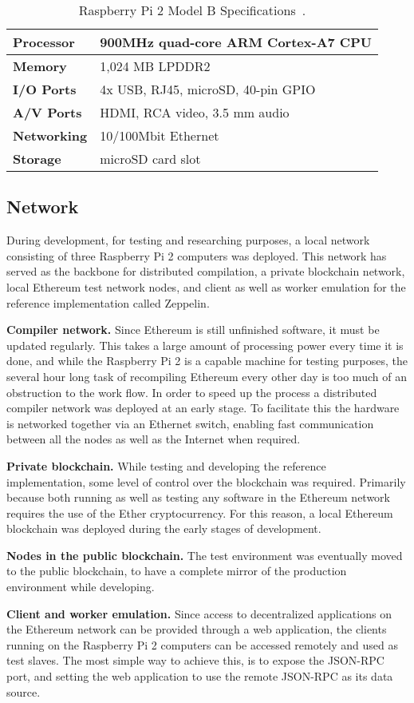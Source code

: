 \begin{table}[h]
\centering
\caption{Raspberry Pi 2 Model B Specifications~\cite{rpi}.}
\label{rpi}
\begin{tabular}{|l|l|}
\hline \textbf{Processor} & 900MHz quad-core ARM Cortex-A7 CPU \\ \hline
\textbf{Memory} & 1,024 MB LPDDR2 \\ \hline 
\textbf{I/O Ports} & 4x USB, RJ45, microSD, 40-pin GPIO \\ \hline
\textbf{A/V Ports} & HDMI, RCA video, 3.5 mm audio \\ \hline
\textbf{Networking} & 10/100Mbit Ethernet \\ \hline
\textbf{Storage} & microSD card slot \\ \hline
\end{tabular}
\end{table}

\subsection{Network}
During development, for testing and researching purposes, a local network consisting of three Raspberry Pi 2 computers was deployed. This network has served as the backbone for distributed compilation, a private blockchain network, local Ethereum test network nodes, and client as well as worker emulation for the reference implementation called Zeppelin.

\textbf{Compiler network.} Since Ethereum is still unfinished software, it must be updated regularly. This takes a large amount of processing power every time it is done, and while the Raspberry Pi 2 is a capable machine for testing purposes, the several hour long task of recompiling Ethereum every other day is too much of an obstruction to the work flow. In order to speed up the process a distributed compiler network was deployed at an early stage. To facilitate this the hardware is networked together via an Ethernet switch, enabling fast communication between all the nodes as well as the Internet when required. 

\textbf{Private blockchain.} While testing and developing the reference implementation, some level of control over the blockchain was required. Primarily because both running as well as testing any software in the Ethereum network requires the use of the Ether cryptocurrency. For this reason, a local Ethereum blockchain was deployed during the early stages of development.

\textbf{Nodes in the public blockchain.} The test environment was eventually moved to the public blockchain, to have a complete mirror of the production environment while developing.

\textbf{Client and worker emulation.} Since access to decentralized applications on the Ethereum network can be provided through a web application, the clients running on the Raspberry Pi 2 computers can be accessed remotely and used as test slaves. The most simple way to achieve this, is to expose the JSON-RPC port, and setting the web application to use the remote JSON-RPC as its data source.
